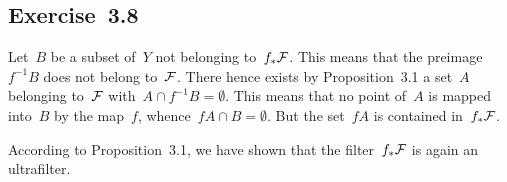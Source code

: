 \subsection{Exercise~3.8}
\label{exercise 3.8}

Let~$B$ be a subset of~$Y$ not belonging to~$f_* \mathcal{F}$.
This means that the preimage~$f^{-1} B$ does not belong to~$\mathcal{F}$.
There hence exists by Proposition~3.1 a set~$A$ belonging to~$\mathcal{F}$ with~$A ∩ f^{-1} B = ∅$.
This means that no point of~$A$ is mapped into~$B$ by the map~$f$, whence~$f A ∩ B = ∅$.
But the set~$f A$ is contained in~$f_* \mathcal{F}$.

According to Proposition~3.1, we have shown that the filter~$f_* \mathcal{F}$ is again an ultrafilter.
